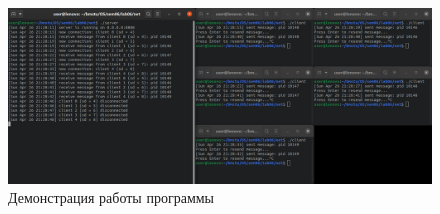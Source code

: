 \documentclass[a4paper,oneside,12pt]{extreport}
\begin{document}




\begin{figure}[H]
	\centering
	\includegraphics[width=\linewidth]{inc/img/net-runtime}
	\caption{Демонстрация работы программы}
	\label{img:net-runtime}
\end{figure}
\end{document}
